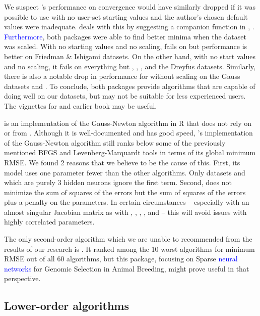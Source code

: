We suspect 's performance on convergence would have similarly
dropped if it was possible to use  with no user-set starting
values and the author's chosen default values were inadequate.
 deals with this by suggesting a companion function in
, . \textcolor{blue}{Furthermore}, both
packages were able to find better minima when the dataset was scaled.
With no starting values and no scaling,  fails on
 but performance is better on Friedman \& Ishigami
datasets. On the other hand, with no start values and no scaling, it
fails on everything but , ,
, and the Dreyfus datasets. Similarly, there is also a
notable drop in performance for  without scaling on the Gauss
datasets and . To conclude, both packages provide
algorithms that are capable of doing well on our datasets, but may not
be suitable for less experienced users. The vignettes for  and
earlier book \citep{Nash-nlpor14} may be useful.

 \citep{R-brnn} is an implementation of the Gauss-Newton
algorithm in \textsf{R } that does not rely on  or 
from . Although it is well-documented and has good speed,
's implementation of the Gauss-Newton algorithm still ranks
below some of the previously mentioned BFGS and Levenberg-Marquardt
tools in terms of its global minimum RMSE. We found 2 reasons that we
believe to be the cause of this. First, its model uses one parameter
fewer than the other algorithms. Only datasets  and
 which are purely 3 hidden neurons ignore the first
term. Second,  does not minimize the sum of squares of the
errors but the sum of squares of the errors plus a penalty on the
parameters. In certain circumstances -- especially with an almost
singular Jacobian matrix as with , ,
, , and  -- this will avoid
issues with highly correlated parameters.

The only second-order algorithm which we are unable to recommended from
the results of our research is  \citep{R-snnR}. It ranked
among the 10 worst algorithms for minimum RMSE out of all 60 algorithms,
but this package, focusing on Sparse \textcolor{blue}{neural networks}
for Genomic Selection in Animal Breeding, might prove useful in that
perspective.

\hypertarget{lower-order-algorithms}{%
\subsection{Lower-order algorithms}\label{lower-order-algorithms}}

